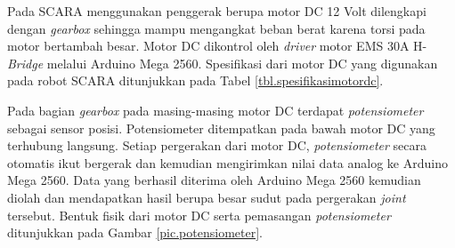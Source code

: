 Pada  SCARA menggunakan penggerak berupa motor DC 12 Volt dilengkapi dengan \textit{gearbox} sehingga mampu mengangkat beban berat karena torsi pada motor bertambah besar. Motor DC dikontrol oleh \textit{driver} motor EMS 30A H-\textit{Bridge} melalui Arduino Mega 2560. Spesifikasi dari motor DC yang digunakan pada robot SCARA ditunjukkan pada Tabel \ref{tbl.spesifikasimotordc}.
	\begin{table}[H]
	\centering
	\caption{Spesifikasi Motor DC pada Robot SCARA}
	\label{tbl.spesifikasimotordc}
\end{table}
Pada bagian \textit{gearbox} pada masing-masing motor DC terdapat \textit{potensiometer} sebagai sensor posisi. Potensiometer ditempatkan pada bawah motor DC yang terhubung langsung. Setiap pergerakan dari motor DC, \textit{potensiometer} secara otomatis ikut bergerak dan kemudian mengirimkan nilai data analog ke Arduino Mega 2560. Data yang berhasil diterima oleh Arduino Mega 2560 kemudian diolah dan mendapatkan hasil berupa besar sudut pada pergerakan \textit{joint} tersebut. Bentuk fisik dari motor DC serta pemasangan \textit{potensiometer} ditunjukkan pada Gambar \ref{pic.potensiometer}.
